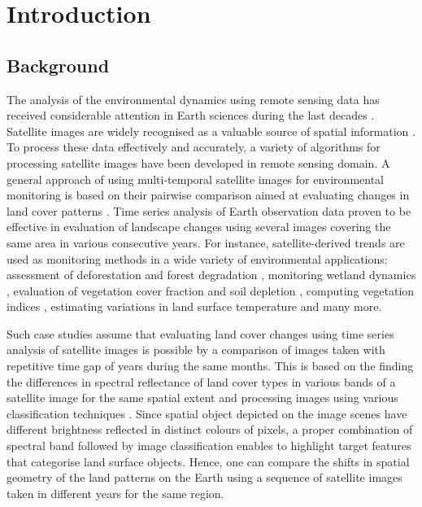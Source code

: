 \documentclass[remotesensing,article,submit,pdftex,moreauthors]{Definitions/mdpi}
\begin{document}
\section{Introduction}

\subsection{Background}
The analysis of the environmental dynamics using remote sensing data has received considerable attention in Earth sciences during the last decades \cite{SULTANA2023267,PAYRA2023239,MERTIKAS2021107}. Satellite images are widely recognised as a valuable source of spatial information \cite{Richards,Costel,Lerat}. To process these data effectively and accurately, a variety of algorithms for processing satellite images have been developed in remote sensing domain. A general approach of using multi-temporal satellite images for environmental monitoring is based on their pairwise comparison aimed at evaluating changes in land cover patterns \cite{OGILVIE2015368,Hiernaux}. Time series analysis of Earth observation data proven to be effective in evaluation of landscape changes using several images covering the same area in various consecutive years. For instance, satellite-derived trends are used as monitoring methods in a wide variety of environmental applications: assessment of deforestation and forest degradation \cite{MASOLELE2021112600,rs11242999,ijgi11110573,rs9090905}, monitoring wetland dynamics \cite{KOVACS2022113267,land11122137}, evaluation of vegetation cover fraction and soil depletion \cite{DUBE2017112,rs15010020}, computing vegetation indices \cite{VENTER2020106206,app122412554,f13122066}, estimating variations in land surface temperature \cite{CARRILLONIQUETE2022104280} and many more. 

Such case studies assume that evaluating land cover changes using time series analysis of satellite images is possible by a comparison of images taken with repetitive time gap of years during the same months. This is based on the finding the differences in spectral reflectance of land cover types in various bands of a satellite image for the same spatial extent and processing images using various classification techniques \cite{SHAHI202385,MERRY2023269,GANDHI201681}. Since spatial object depicted on the image scenes have different brightness reflected in distinct colours of pixels, a proper combination of spectral band followed by image classification enables to highlight target features that categorise land surface objects. Hence, one can compare the shifts in spatial geometry of the land patterns on the Earth using a sequence of satellite images taken in different years for the same region. 
\end{document}
